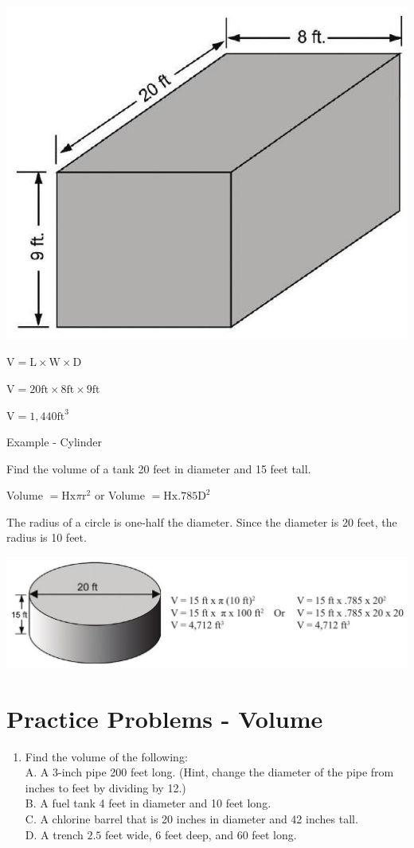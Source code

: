 \documentclass[10pt]{article}
\begin{document}
\includegraphics[max width=\textwidth]{2022_09_11_72dbedc910e6e984560cg-30}

$\mathrm{V}=\mathrm{L} \times \mathrm{W} \times \mathrm{D}$

$\mathrm{V}=20 \mathrm{ft} \times 8 \mathrm{ft} \times 9 \mathrm{ft}$

$\mathrm{V}=1,440 \mathrm{ft}^{3}$

Example - Cylinder

Find the volume of a tank 20 feet in diameter and 15 feet tall.

Volume $=\mathrm{Hx} \pi \mathrm{r}^{2}$ or Volume $=\mathrm{H} \mathrm{x} .785 \mathrm{D}^{2}$

The radius of a circle is one-half the diameter. Since the diameter is 20 feet, the radius is 10 feet.

\includegraphics[max width=\textwidth]{2022_09_11_72dbedc910e6e984560cg-30(1)}

\section{Practice Problems - Volume}
\begin{enumerate}
  \item Find the volume of the following:\\
A. A 3-inch pipe 200 feet long. (Hint, change the diameter of the pipe from inches to feet by dividing by 12.)\\
B. A fuel tank 4 feet in diameter and 10 feet long.\\
C. A chlorine barrel that is 20 inches in diameter and 42 inches tall.\\
D. A trench $2.5$ feet wide, 6 feet deep, and 60 feet long.
\end{enumerate}
\end{document}
